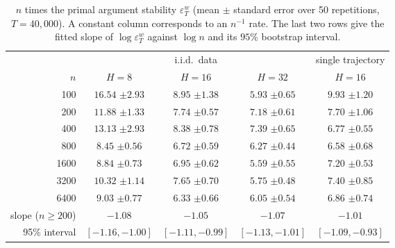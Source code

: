 \begin{table}[t]
\centering
\footnotesize
\setlength{\tabcolsep}{4pt}
\caption{$n$ times the primal argument stability $\varepsilon^w_T$ (mean $\pm$ standard error over 50
repetitions, $T=40{,}000$). A constant column corresponds to an $n^{-1}$ rate. The last two rows give the
fitted slope of $\log\varepsilon^w_T$ against $\log n$ and its $95\%$ bootstrap interval.}
\label{tab:exp-stability}
\begin{tabular}{@{}rcccc@{}}
\toprule
 & \multicolumn{3}{c}{i.i.d.\ data} & single trajectory \\
\cmidrule(lr){2-4}
$n$ & $H=8$ & $H=16$ & $H=32$ & $H=16$ \\
\midrule
100 & $16.54$ {\scriptsize$\pm2.93$} & $8.95$ {\scriptsize$\pm1.38$} & $5.93$ {\scriptsize$\pm0.65$} & $9.93$ {\scriptsize$\pm1.20$} \\
200 & $11.88$ {\scriptsize$\pm1.33$} & $7.74$ {\scriptsize$\pm0.57$} & $7.18$ {\scriptsize$\pm0.61$} & $7.70$ {\scriptsize$\pm1.06$} \\
400 & $13.13$ {\scriptsize$\pm2.93$} & $8.38$ {\scriptsize$\pm0.78$} & $7.39$ {\scriptsize$\pm0.65$} & $6.77$ {\scriptsize$\pm0.55$} \\
800 & $8.45$ {\scriptsize$\pm0.56$} & $6.72$ {\scriptsize$\pm0.59$} & $6.27$ {\scriptsize$\pm0.44$} & $6.58$ {\scriptsize$\pm0.68$} \\
1600 & $8.84$ {\scriptsize$\pm0.73$} & $6.95$ {\scriptsize$\pm0.62$} & $5.59$ {\scriptsize$\pm0.55$} & $7.20$ {\scriptsize$\pm0.53$} \\
3200 & $10.32$ {\scriptsize$\pm1.14$} & $7.65$ {\scriptsize$\pm0.70$} & $5.75$ {\scriptsize$\pm0.48$} & $7.40$ {\scriptsize$\pm0.85$} \\
6400 & $9.03$ {\scriptsize$\pm0.77$} & $6.33$ {\scriptsize$\pm0.66$} & $6.05$ {\scriptsize$\pm0.54$} & $6.86$ {\scriptsize$\pm0.74$} \\
\midrule
slope ($n\ge 200$) & $-1.08$ & $-1.05$ & $-1.07$ & $-1.01$ \\
95\% interval & {\scriptsize$[-1.16,-1.00]$} & {\scriptsize$[-1.11,-0.99]$} & {\scriptsize$[-1.13,-1.01]$} & {\scriptsize$[-1.09,-0.93]$} \\
\bottomrule
\end{tabular}
\end{table}

